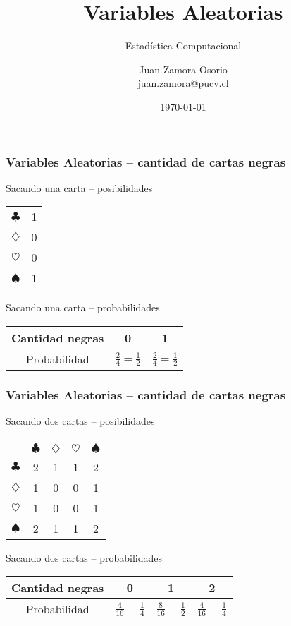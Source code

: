 \documentclass[table]{beamer}
\title{Variables Aleatorias}
\subtitle{Estadística Computacional}
\author[J.Z.O-2023]{Juan Zamora Osorio\\\url{juan.zamora@pucv.cl}}
\institute[PUCV]{Instituto de Estadística\\Pontificia Universidad Cat\'olica de Valpara\'iso}
\date{\today}
\begin{document}
\frame{\titlepage}



\begin{frame}
    \frametitle{Variables Aleatorias -- cantidad de cartas negras}
    \begin{block}{Sacando una carta -- posibilidades}
        \begin{center}
            \begin{tabular}{c|c}
                $\clubsuit$ & 1 \\
                $\diamondsuit$ & 0 \\
                $\heartsuit$ & 0 \\
                $\spadesuit$ & 1
            \end{tabular}
        \end{center}
    \end{block}
    \begin{block}{Sacando una carta -- probabilidades}
        \begin{center}
            \begin{tabular}{c|c|c}
                Cantidad negras & 0 & 1 \\
                \hline
                Probabilidad & $\frac{2}{4} = \frac{1}{2}$ & $\frac{2}{4} = \frac{1}{2}$
            \end{tabular}
        \end{center}
    \end{block}
\end{frame}

\begin{frame}
    \frametitle{Variables Aleatorias -- cantidad de cartas negras}
    \begin{block}{Sacando dos cartas -- posibilidades}
        \begin{center}
            \begin{tabular}{c|cccc}
                & $\clubsuit$ & $\diamondsuit$ & $\heartsuit$ & $\spadesuit$ \\
                \hline
                $\clubsuit$ & 2 & 1 & 1 & 2 \\
                $\diamondsuit$ & 1 & 0 & 0 & 1 \\
                $\heartsuit$ & 1 & 0 & 0 & 1 \\
                $\spadesuit$ & 2 & 1 & 1 & 2
            \end{tabular}
        \end{center}
    \end{block}
    \begin{block}{Sacando dos cartas -- probabilidades}
        \begin{center}
            \begin{tabular}{c|c|c|c}
                Cantidad negras & 0 & 1 & 2 \\
                \hline
                Probabilidad & $\frac{4}{16} = \frac{1}{4}$ &
                $\frac{8}{16} = \frac{1}{2}$ &
                $\frac{4}{16} = \frac{1}{4}$
            \end{tabular}
        \end{center}
    \end{block}
\end{frame}
\end{document}
